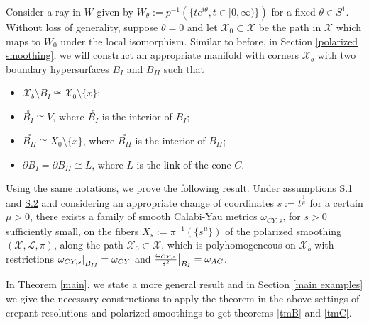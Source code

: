 \documentclass[a4paper,11pt]{article}
\newenvironment{customthm}[1]  {\renewcommand\theinnercustomthm{#1}\innercustomthm}
  {\endinnercustomthm}
\newcommand\restr[2]{{%
  \left.\kern-\nulldelimiterspace %
  #1 %
  \littletaller %
  \right|_{#2} %
  }}
\newcommand{\littletaller}{\mathchoice{\vphantom{\big|}}{}{}{}}
\begin{document}
Consider a ray in $W$ given by $W_\theta := p^{-1}\left( \{ t e^{i \theta},  t \in[0, \infty) \}\right)$ for a fixed $\theta \in S^1$. Without loss of generality, suppose $\theta=0$ and let $\mathcal{X}_0 \subset \mathcal{X}$ be the path in $\mathcal{X}$ which maps to $W_0$ under the local isomorphism. Similar to before, in Section \ref{polarized smoothing}, we will construct an appropriate manifold with corners $\mathcal{X}_b$ with two boundary hypersurfaces $B_{I}$ and $B_{II}$ such that
\begin{itemize}
    \item $\mathcal{X}_b \setminus B_I \cong \mathcal{X}_0 \setminus \{x \}$;
    \item $\overset{\circ}{B_I} \cong V$, where $\overset{\circ}{B_I}$ is the interior of $B_I$;
    \item $\overset{\circ}{B_{II}} \cong X_0 \setminus \{ x\}$, where $\overset{\circ}{B_{II}}$ is the interior of $B_{II}$;
    \item $\partial B_I = \partial B_{II} \cong L$, where $L$ is the link of the cone $C$.
\end{itemize}
Using the same notations, we prove the following result.
\begin{customthm}{C} \label{tmC}
    Under assumptions \hyperlink{S.1}{S.1} and \hyperlink{S.2}{S.2} and considering an appropriate change of coordinates $s := t^{\frac{1}{\mu}}$ for a certain $\mu>0$, there exists a family of smooth Calabi-Yau metrics $\omega_{CY,s}$, for $s>0$ sufficiently small, on the fibers $X_s:= \pi^{-1}(\{s^\mu\})$ of the polarized smoothing $(\mathcal{X}, \mathcal{L}, \pi)$, along the path $\mathcal{X}_0 \subset \mathcal{X}$, which is polyhomogeneous on $\mathcal{X}_b$ with restrictions $\restr{\omega_{CY,s}}{B_{II}} = \omega_{CY}$ and $\restr{\frac{\omega_{CY,s}}{s^{2}}}{B_I} = \omega_{AC}$.
\end{customthm}


In Theorem \ref{main}, we state a more general result and in Section \ref{main examples} we give the necessary constructions to apply the theorem in the above settings of crepant resolutions and polarized smoothings to get theorems \ref{tmB} and \ref{tmC}.\\
\end{document}
